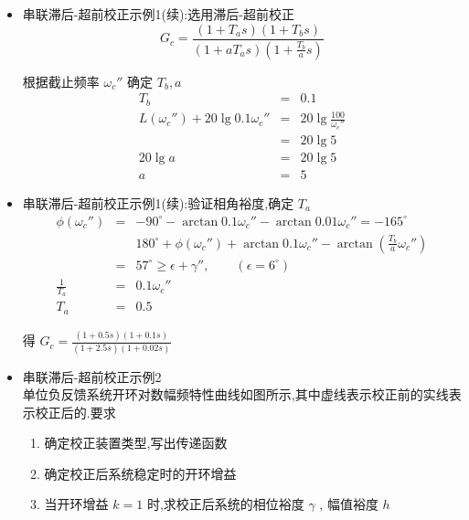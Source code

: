 \documentclass[table]{article}
\begin{document}
\begin{frame}
\begin{itemize}
\begin{itemize}
\begin{itemize}
\begin{itemize}
\item 串联滞后-超前校正示例1(续):选用滞后-超前校正\\
\label{sec-2-2-10-2-5-2-2}%
\[G_c = \frac{(1+T_a s)(1+T_b s)}{(1+aT_a s)(1+\frac{T_b}{a}s)}\]

根据截止频率  $\omega_c''$  确定  $T_b,a$ 
\begin{eqnarray*}
T_b & = & 0.1\\
L(\omega_c'') +20\lg0.1\omega_c'' &=& 20\lg\frac{100}{\omega_c''} \\
&=& 20\lg5\\
20\lg a &=& 20\lg5 \\
a &=& 5 
\end{eqnarray*}


\item 串联滞后-超前校正示例1(续):验证相角裕度,确定 $T_{a}$\\
\label{sec-2-2-10-2-5-2-3}%
\begin{eqnarray*}
\phi(\omega_c'') &=& -90^{\circ}-\arctan 0.1\omega_c''-\arctan 0.01\omega_c'' 
 = -165^{\circ} \\
 & & 180^{\circ}+\phi(\omega_c'')+\arctan0.1\omega_c''-\arctan(\frac{T_b}{a}\omega_c'') \\
&=& 57^{\circ} 
 \geq  \epsilon+\gamma'' ,\qquad (\epsilon = 6^{\circ})\\
\frac{1}{T_a} &=&0.1\omega_c''\\
T_a &=& 0.5
\end{eqnarray*}

得  $G_c=\frac{(1+0.5s)(1+0.1s)}{(1+2.5s)(1+0.02s)}$ 


\item 串联滞后-超前校正示例2\\
\label{sec-2-2-10-2-5-2-4}%
单位负反馈系统开环对数幅频特性曲线如图所示,其中虚线表示校正前的实线表示校正后的.要求
\begin{enumerate}
\item 确定校正装置类型,写出传递函数
\item 确定校正后系统稳定时的开环增益
\item 当开环增益  $k=1$  时,求校正后系统的相位裕度  $\gamma$ , 幅值裕度  $h$
\end{enumerate}

\begin{itemize}


\end{itemize}
\end{itemize}
\end{itemize}
\end{itemize}
\end{itemize}
\end{frame}
\end{document}
